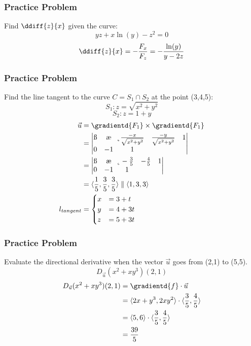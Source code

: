 \documentclass{math}
\begin{document}
\subsubsection*{Practice Problem}
Find \( \ddiff{z}{x} \) given the curve:
\[ yz +x\ln(y)-z^2 = 0 \]
\[ \ddiff{z}{x} = -\frac{F_x}{F_z} = -\frac{\ln(y)}{y-2z} \]

\subsubsection*{Practice Problem}
Find the line tangent to the curve \( C = S_1\cap S_2 \) at the point (3,4,5):
\[ S_1: z = \sqrt{x^2+y^2} \]
\[ S_2: z = 1+y \]
\begin{align*}
  \vec{u} &= \gradientd{F_1}\times\gradientd{F_1} \\
  &= \begin{vmatrix}
    \i & \j & \k \\
    \frac{-x}{\sqrt{x^2+y^2}} & \frac{-y}{\sqrt{x^2+y^2}} & 1 \\
    0 & -1 & 1
  \end{vmatrix} \\
  &= \begin{vmatrix}
    \i & \j & \k \\
    -\frac{3}{5} & -\frac{4}{5} & 1 \\
    0 & -1 & 1
  \end{vmatrix} \\
  &= \langle\frac{1}{5},\frac{3}{5},\frac{3}{5}\rangle \parallel
    \langle1,3,3\rangle \\
  l_{tangent} &= \begin{cases}
    x &= 3+t \\
    y &= 4+3t \\
    z &= 5+3t
  \end{cases}
\end{align*}

\subsubsection*{Practice Problem}
Evaluate the directional derivative when the vector \( \vec{u} \) goes from
(2,1) to (5,5).
\[ D_{\vec{u}}(x^2+xy^3)(2,1) \]
\begin{align*}
  D_{\vec{u}}(x^2+xy^3)(2,1) &= \gradientd{f}\cdot\vec{u} \\
  &= \langle2x+y^3,2xy^2\rangle\cdot\langle\frac{3}{5},\frac{4}{5}\rangle \\
  &= \langle5,6\rangle\cdot\langle\frac{3}{5},\frac{4}{5}\rangle \\
  &= \frac{39}{5}
\end{align*}
\end{document}
